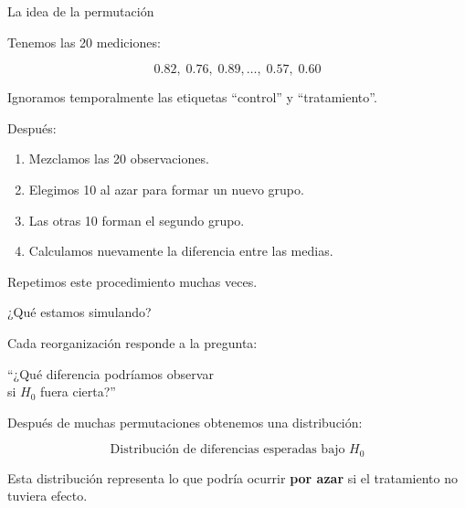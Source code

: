 \documentclass[11pt, aspectratio=169]{beamer}
\begin{document}
\begin{frame}{La idea de la permutación}

Tenemos las 20 mediciones:

\[
0.82,\;0.76,\;0.89,\ldots,\;0.57,\;0.60
\]

Ignoramos temporalmente las etiquetas
``control'' y ``tratamiento''.

\vspace{0.4cm}

Después:

\begin{enumerate}
    \item Mezclamos las 20 observaciones.
    \item Elegimos 10 al azar para formar un nuevo grupo.
    \item Las otras 10 forman el segundo grupo.
    \item Calculamos nuevamente la diferencia entre las medias.
\end{enumerate}

\vspace{0.3cm}

Repetimos este procedimiento muchas veces.

\end{frame}

\begin{frame}{¿Qué estamos simulando?}

Cada reorganización responde a la pregunta:

\begin{center}
\Large
``¿Qué diferencia podríamos observar \\
si $H_0$ fuera cierta?''
\end{center}

\vspace{0.5cm}

Después de muchas permutaciones obtenemos una distribución:

\[
\boxed{
\text{Distribución de diferencias esperadas bajo }H_0
}
\]

Esta distribución representa lo que podría ocurrir
\textbf{por azar} si el tratamiento no tuviera efecto.

\end{frame}
\end{document}

